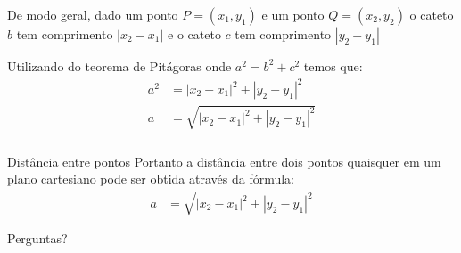 \documentclass[handout]{beamer}
\begin{document}

\begin{frame}[fragile]\frametitle{\subsecname}
    De modo geral, dado um ponto $P = (x_1,y_1)$ e um ponto $Q = (x_2,y_2)$ o 
    cateto $b$ tem comprimento $|x_2-x_1|$ e o cateto $c$ tem comprimento $|y_2-y_1|$
    \begin{figure}[H]
        \centering
    \end{figure}
    Utilizando do teorema de Pitágoras onde $a^2 = b^2 + c^2$ temos que:
    \begin{align*}
        a^2 &= |x_2-x_1|^2 + |y_2-y_1|^2\\[1ex]
        a &= \sqrt{|x_2-x_1|^2 + |y_2-y_1|^2}
    \end{align*}
\end{frame}


\begin{frame}[fragile]\frametitle{\subsecname}

    \begin{block}{Distância entre pontos}
    Portanto a distância entre dois pontos quaisquer em um plano cartesiano 
    pode ser obtida através da fórmula:
    \begin{align*}
        a &= \sqrt{|x_2-x_1|^2 + |y_2-y_1|^2}
    \end{align*}
    \end{block}
\end{frame}



\begin{frame}
    \Huge{\centerline{Perguntas?}}
\end{frame}

\end{document}
